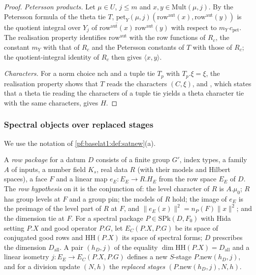 \begin{proof}
\emph{Petersson products.} Let $\mu\in U$, $j\le m$ and $x,y\in\mathrm{Mult}(\mu,j)$. By the Petersson formula of the
theta tie $T$, $\mathrm{pet}_Y(\mu,j)(\mathrm{row}^{\mathrm{aut}}(x),\mathrm{row}^{\mathrm{aut}}(y))$ is the quotient integral over $Y_j$ of
$\overline{\mathrm{row}^{\mathrm{aut}}(x)}\,\mathrm{row}^{\mathrm{aut}}(y)$ with respect to $m_Y\,c_{\mathrm{pet}}$. The realisation property
identifies $\mathrm{row}^{\mathrm{aut}}$ with the row functions of $R_c$, the constant $m_Y$ with that of $R_c$ and the Petersson
constants of $T$ with those of $R_c$; the quotient-integral identity of $R_c$ then gives $\langle x,y\rangle$.

\emph{Characters.} For a norm choice $\mathrm{nch}$ and a tuple tie $T_p$ with $T_p.\xi=\xi$, the realisation property
shows that $T$ reads the characters $(C,\xi)$, and , which
states that a theta tie reading the characters of a tuple tie yields a theta character tie with the same characters,
gives $H$.
\end{proof}

\subsubsection{Spectral objects over replaced stages}\label{pf:baselat1:sssec:satproofs}

We use the notation of \cref{pf:baselat1:def:satnew}(a).

\begin{definition}\label{pf:baselat1:def:rowpack}
A \emph{row package} for a datum $D$ consists of a finite group
$G'$, index types, a family $A$ of inputs, a number field $K_s$, real data $R$ (with their models and Hilbert spaces), a
face $F$ and a linear map $e_E\colon E_E\to R.H_E$ from the row space $E_E$ of $D$. The \emph{row hypothesis} on it is the
conjunction of: the level character of $R$ is $A.\mu_0$; $R$ has group levels at $F$ and a group pin; the models of $R$
hold; the image of $e_E$ is the preimage of the level part of $R$ at $F$, and $\|e_E(x)\|^2=n_P(F)\|x\|^2$; and the
dimension tie at $F$. For a spectral package $P\in\mathrm{SPk}(D,F_0)$ with Hida setting $P.X$ and good operator $P.G$,
let $E_C(P.X,P.G)$ be its space of conjugated good rows and $\mathrm{HH}(P.X)$ its space of spectral forms; $D$ prescribes
the dimension $D_{\mathrm{all}}$. A pair $(h_D,j)$ of the equality $\dim\mathrm{HH}(P.X)=D_{\mathrm{all}}$ and a linear
isometry $j\colon E_E\to E_C(P.X,P.G)$ defines a new $S$-stage $P.\mathrm{new}(h_D,j)$, and for a division update
$(N,h)$ the \emph{replaced stages} $(P.\mathrm{new}(h_D,j),N,h)$.
%
\end{definition}

